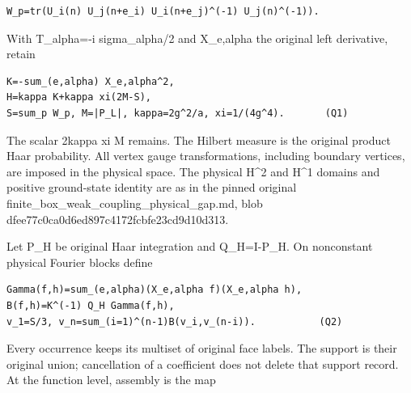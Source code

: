 \documentclass[11pt,a4paper]{article}
\renewcommand{\[}{\begingroup\small\originaldisplaystart}
\renewcommand{\]}{\originaldisplayend\endgroup}
\begin{document}
\begin{verbatim}
W_p=tr(U_i(n) U_j(n+e_i) U_i(n+e_j)^(-1) U_j(n)^(-1)).
\end{verbatim}

With T\_alpha=-i sigma\_alpha/2 and X\_e,alpha the original left
derivative, retain

\begin{verbatim}
K=-sum_(e,alpha) X_e,alpha^2,
H=kappa K+kappa xi(2M-S),
S=sum_p W_p, M=|P_L|, kappa=2g^2/a, xi=1/(4g^4).       (Q1)
\end{verbatim}

The scalar 2kappa xi M remains. The Hilbert measure is the original
product Haar probability. All vertex gauge transformations, including
boundary vertices, are imposed in the physical space. The physical
H\^{}2 and H\^{}1 domains and positive ground-state identity are as in
the pinned original
{\ttfamily f\allowbreak{}i\allowbreak{}n\allowbreak{}i\allowbreak{}t\allowbreak{}e\allowbreak{}\_\allowbreak{}b\allowbreak{}o\allowbreak{}x\allowbreak{}\_\allowbreak{}w\allowbreak{}e\allowbreak{}a\allowbreak{}k\allowbreak{}\_\allowbreak{}c\allowbreak{}o\allowbreak{}u\allowbreak{}p\allowbreak{}l\allowbreak{}i\allowbreak{}n\allowbreak{}g\allowbreak{}\_\allowbreak{}p\allowbreak{}h\allowbreak{}y\allowbreak{}s\allowbreak{}i\allowbreak{}c\allowbreak{}a\allowbreak{}l\allowbreak{}\_\allowbreak{}g\allowbreak{}a\allowbreak{}p\allowbreak{}.\allowbreak{}m\allowbreak{}d\allowbreak{}},
blob
{\ttfamily d\allowbreak{}f\allowbreak{}e\allowbreak{}e\allowbreak{}7\allowbreak{}7\allowbreak{}c\allowbreak{}0\allowbreak{}c\allowbreak{}a\allowbreak{}0\allowbreak{}d\allowbreak{}6\allowbreak{}e\allowbreak{}d\allowbreak{}8\allowbreak{}9\allowbreak{}7\allowbreak{}c\allowbreak{}4\allowbreak{}1\allowbreak{}7\allowbreak{}2\allowbreak{}f\allowbreak{}c\allowbreak{}b\allowbreak{}f\allowbreak{}e\allowbreak{}2\allowbreak{}3\allowbreak{}c\allowbreak{}d\allowbreak{}9\allowbreak{}d\allowbreak{}1\allowbreak{}0\allowbreak{}d\allowbreak{}3\allowbreak{}1\allowbreak{}3\allowbreak{}}.

Let P\_H be original Haar integration and Q\_H=I-P\_H. On nonconstant
physical Fourier blocks define

\begin{verbatim}
Gamma(f,h)=sum_(e,alpha)(X_e,alpha f)(X_e,alpha h),
B(f,h)=K^(-1) Q_H Gamma(f,h),
v_1=S/3, v_n=sum_(i=1)^(n-1)B(v_i,v_(n-i)).           (Q2)
\end{verbatim}

Every occurrence keeps its multiset of original face labels. The support
is their original union; cancellation of a coefficient does not delete
that support record. At the function level, assembly is the map
\end{document}
